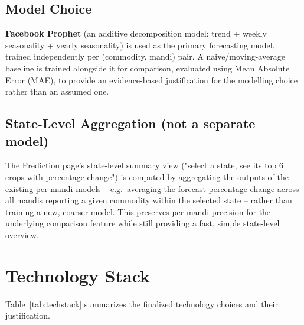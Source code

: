 \subsection{Model Choice}
\textbf{Facebook Prophet} (an additive decomposition model: trend +
weekly seasonality + yearly seasonality) is used as the primary
forecasting model, trained independently per (commodity, mandi) pair. A
naive/moving-average baseline is trained alongside it for comparison,
evaluated using Mean Absolute Error (MAE), to provide an evidence-based
justification for the modelling choice rather than an assumed one.

\subsection{State-Level Aggregation (not a separate model)}
The Prediction page's state-level summary view ("select a state, see its
top 6 crops with percentage change") is computed by aggregating the
outputs of the existing per-mandi models -- e.g.\ averaging the forecast
percentage change across all mandis reporting a given commodity within
the selected state -- rather than training a new, coarser model. This
preserves per-mandi precision for the underlying comparison feature while
still providing a fast, simple state-level overview.

\section{Technology Stack}
Table~\ref{tab:techstack} summarizes the finalized technology choices and
their justification.

